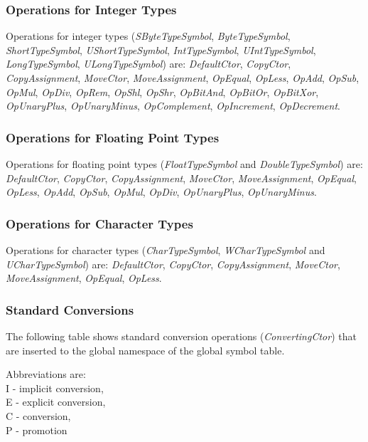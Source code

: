 \documentclass[a4paper,oneside,11pt]{book}
\theoremstyle{definition}
\begin{document}
\subsubsection{Operations for Integer Types}

Operations for integer types (\emph{SByteTypeSymbol}, \emph{ByteTypeSymbol}, \emph{ShortTypeSymbol}, \emph{UShortTypeSymbol}, \emph{IntTypeSymbol},
\emph{UIntTypeSymbol}, \emph{LongTypeSymbol}, \emph{ULongTypeSymbol}) are:
\emph{DefaultCtor}, \emph{CopyCtor}, \emph{CopyAssignment}, \emph{MoveCtor}, \emph{MoveAssignment}, \emph{OpEqual}, \emph{OpLess},
\emph{OpAdd}, \emph{OpSub}, \emph{OpMul}, \emph{OpDiv}, \emph{OpRem}, \emph{OpShl}, \emph{OpShr}, \emph{OpBitAnd}, \emph{OpBitOr}, \emph{OpBitXor},
\emph{OpUnaryPlus}, \emph{OpUnaryMinus}, \emph{OpComplement}, \emph{OpIncrement}, \emph{OpDecrement}.

\subsubsection{Operations for Floating Point Types}

Operations for floating point types (\emph{FloatTypeSymbol} and \emph{DoubleTypeSymbol}) are:
\emph{DefaultCtor}, \emph{CopyCtor}, \emph{CopyAssignment}, \emph{MoveCtor}, \emph{MoveAssignment}, \emph{OpEqual}, \emph{OpLess},
\emph{OpAdd}, \emph{OpSub}, \emph{OpMul}, \emph{OpDiv}, \emph{OpUnaryPlus}, \emph{OpUnaryMinus}.

\subsubsection{Operations for Character Types}

Operations for character types (\emph{CharTypeSymbol}, \emph{WCharTypeSymbol} and \emph{UCharTypeSymbol}) are:
\emph{DefaultCtor}, \emph{CopyCtor}, \emph{CopyAssignment}, \emph{MoveCtor}, \emph{MoveAssignment}, \emph{OpEqual}, \emph{OpLess}.

\subsubsection{Standard Conversions}

The following table shows standard conversion operations (\emph{ConvertingCtor})
that are inserted to the global namespace of the global symbol table.

\begin{flushleft}
Abbreviations are:\\
I - implicit conversion,\\
E - explicit conversion,\\
C - conversion,\\
P - promotion
\end{flushleft}
\end{document}

